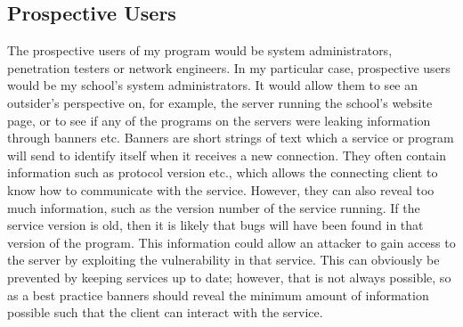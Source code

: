 \documentclass[titlepage]{article}
\let\Oldsubsection\subsection{}
\renewcommand{\subsection}{\FloatBarrier\Oldsubsection}
\begin{document}
\begin{algorithm}
  \caption{\textit{%
    This is an example algorithm for parsing the port range argument I gave
    as an example above, extended by allowing for comma separated lists
    of ports intermixed with ranges.
}}\label{argumentparsing}
  \begin{algorithmic}[1]
        \EndFor{}
      \Else{}
      \EndIf{}
    \EndFor{}
    \EndProcedure{}
  \end{algorithmic}
\end{algorithm}

\subsection{Prospective Users}

The prospective users of my program would be system administrators, penetration testers or network
engineers. In my particular case, prospective users would be my school's system administrators.
It would allow them to see an outsider's perspective on,
for example, the \gls{server} running the school's website page,
or to see if any of the programs on the \glspl{server} were leaking information
through \glspl{banner} etc.
Banners are short strings of text which a service or program will send to identify itself when
it receives a new connection. They often contain information such as protocol version etc., which
allows the connecting client to know how to communicate with the service. However, they can also
reveal too much information, such as the version number of the service running. 
If the service version is old, then it is likely that bugs will have been found in that version 
of the program.
This information could allow an attacker to gain access to the server by exploiting the vulnerability
in that service. This can obviously be prevented by keeping services up to date; however, that
is not always possible, so as a best practice banners should reveal the minimum amount of information
possible such that the client can interact with the service.
\end{document}
